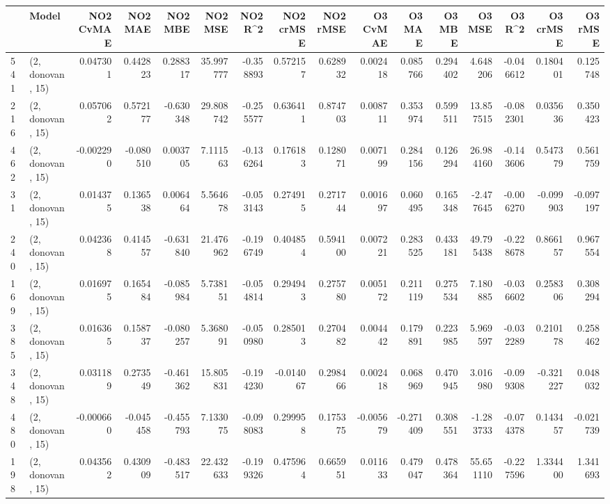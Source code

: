 \begin{tabular}{llrrrrrrrrrrrrrr}
\toprule
{} &             Model &  NO2 CvMAE &   NO2 MAE &   NO2 MBE &     NO2 MSE &   NO2 R\textasciicircum2 &  NO2 crMSE &   NO2 rMSE &  O3 CvMAE &    O3 MAE &    O3 MBE &      O3 MSE &    O3 R\textasciicircum2 &   O3 crMSE &    O3 rMSE \\
\midrule
541 &  (2, donovan, 15) &   0.047301 &  0.442823 &  0.288317 &   35.997777 & -0.358893 &   0.572157 &   0.628932 &  0.002418 &  0.085766 &  0.294402 &    4.648206 & -0.046612 &   0.180401 &   0.125748 \\
216 &  (2, donovan, 15) &   0.057062 &  0.572177 & -0.630348 &   29.808742 & -0.255577 &   0.636411 &   0.874703 &  0.008711 &  0.353974 &  0.599511 &   13.857515 & -0.082301 &   0.035636 &   0.350423 \\
462 &  (2, donovan, 15) &  -0.002290 & -0.080510 &  0.003705 &    7.111563 & -0.136264 &   0.176183 &   0.128071 &  0.007199 &  0.284156 &  0.126294 &   26.984160 & -0.143606 &   0.547379 &   0.561759 \\
31  &  (2, donovan, 15) &   0.014375 &  0.136538 &  0.006464 &    5.564678 & -0.053143 &   0.274915 &   0.271744 &  0.001697 &  0.060495 &  0.165348 &   -2.477645 & -0.006270 &  -0.099903 &  -0.097197 \\
240 &  (2, donovan, 15) &   0.042368 &  0.414557 & -0.631840 &   21.476962 & -0.196749 &   0.404854 &   0.594100 &  0.007221 &  0.283525 &  0.433181 &   49.795438 & -0.228678 &   0.866157 &   0.967554 \\
169 &  (2, donovan, 15) &   0.016975 &  0.165484 & -0.085984 &    5.738151 & -0.054814 &   0.294943 &   0.275780 &  0.005172 &  0.211119 &  0.275534 &    7.180885 & -0.036602 &   0.258306 &   0.308294 \\
385 &  (2, donovan, 15) &   0.016365 &  0.158737 & -0.080257 &    5.368091 & -0.050980 &   0.285013 &   0.270482 &  0.004442 &  0.179891 &  0.223985 &    5.969597 & -0.032289 &   0.210178 &   0.258462 \\
348 &  (2, donovan, 15) &   0.031189 &  0.273549 & -0.461362 &   15.805831 & -0.194230 &  -0.014067 &   0.298466 &  0.002418 &  0.068969 &  0.470945 &    3.016980 & -0.099308 &  -0.321227 &   0.048032 \\
480 &  (2, donovan, 15) &  -0.000660 & -0.045458 & -0.455793 &    7.133075 & -0.098083 &   0.299958 &   0.175375 & -0.005679 & -0.271409 &  0.308551 &   -1.283733 & -0.074378 &   0.143457 &  -0.021739 \\
198 &  (2, donovan, 15) &   0.043562 &  0.430909 & -0.483517 &   22.432633 & -0.199326 &   0.475964 &   0.665951 &  0.011633 &  0.479047 &  0.478364 &   55.651110 & -0.227596 &   1.334400 &   1.341693 \\

\end{tabular}
